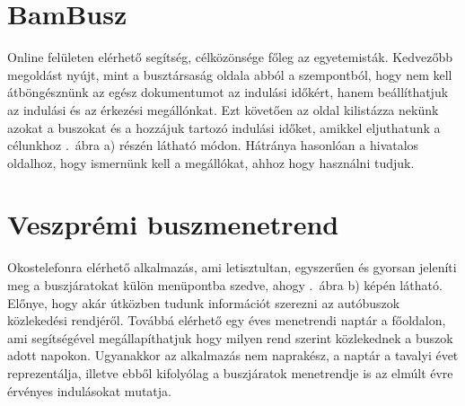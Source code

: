 \section*{BamBusz}
\label{bambusz}

Online felületen elérhető segítség, célközönsége főleg az egyetemisták. 
Kedvezőbb megoldást nyújt, mint a busztársaság oldala abból a szempontból, hogy nem kell átböngésznünk az egész dokumentumot az indulási időkért, hanem beállíthatjuk az indulási és az érkezési megállónkat. 
Ezt követően az oldal kilistázza nekünk azokat a buszokat és a hozzájuk tartozó indulási időket, amikkel eljuthatunk a célunkhoz .\ ábra a) részén látható módon. 
Hátránya hasonlóan a hivatalos oldalhoz, hogy ismernünk kell a megállókat, ahhoz hogy használni tudjuk. 


\section*{Veszprémi buszmenetrend}
\label{veszprbuszmen}

Okostelefonra elérhető alkalmazás, ami letisztultan, egyszerűen és gyorsan jeleníti meg a buszjáratokat külön menüpontba szedve, ahogy .\ ábra b) képén látható. 
Előnye, hogy akár útközben tudunk információt szerezni az autóbuszok közlekedési rendjéről. 
Továbbá elérhető egy éves menetrendi naptár a főoldalon, ami segítségével megállapíthatjuk hogy milyen rend szerint közlekednek a buszok adott napokon. 
Ugyanakkor az alkalmazás nem naprakész, a naptár a tavalyi évet reprezentálja, illetve ebből kifolyólag a buszjáratok menetrendje is az elmúlt évre érvényes indulásokat mutatja.

\newpage
